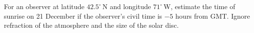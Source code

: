 For an observer at latitude $42.5^\circ$\,N and longitude $71^\circ$\,W,
estimate the time of sunrise on 21 December if the observer's civil time is
$-5$ hours from GMT. Ignore refraction of the atmosphere and the size of the
solar disc.
